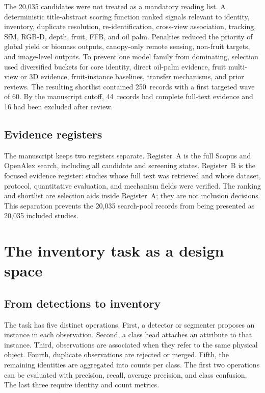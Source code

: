 The 20,035 candidates were not treated as a mandatory reading list. A deterministic title-abstract scoring function ranked signals relevant to identity, inventory, duplicate resolution, re-identification, cross-view association, tracking, SfM, RGB-D, depth, fruit, FFB, and oil palm. Penalties reduced the priority of global yield or biomass outputs, canopy-only remote sensing, non-fruit targets, and image-level outputs. To prevent one model family from dominating, selection used diversified buckets for core identity, direct oil-palm evidence, fruit multi-view or 3D evidence, fruit-instance baselines, transfer mechanisms, and prior reviews. The resulting shortlist contained 250~records with a first targeted wave of 60. By the manuscript cutoff, 44~records had complete full-text evidence and 16 had been excluded after review.

\subsection{Evidence registers}

The manuscript keeps two registers separate. Register~A is the full Scopus and OpenAlex search, including all candidate and screening states. Register~B is the focused evidence register: studies whose full text was retrieved and whose dataset, protocol, quantitative evaluation, and mechanism fields were verified. The ranking and shortlist are selection aids inside Register~A; they are not inclusion decisions. This separation prevents the 20,035 search-pool records from being presented as 20,035 included studies.


\section{The inventory task as a design space}
\label{sec:designspace}

\subsection{From detections to inventory}

The task has five distinct operations. First, a detector or segmenter proposes an instance in each observation. Second, a class head attaches an attribute to that instance. Third, observations are associated when they refer to the same physical object. Fourth, duplicate observations are rejected or merged. Fifth, the remaining identities are aggregated into counts per class. The first two operations can be evaluated with precision, recall, average precision, and class confusion. The last three require identity and count metrics.

